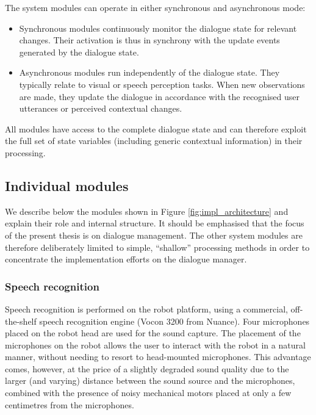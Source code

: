 The system modules can operate in either synchronous and asynchronous mode: \begin{itemize}
\item Synchronous modules continuously monitor the dialogue state for relevant changes.  Their activation is thus in synchrony with the update events generated by the dialogue state.
\item Asynchronous modules run independently of the dialogue state.  They typically relate to visual or speech perception tasks. When new observations are made, they update the dialogue in accordance with the recognised user utterances or perceived contextual changes.

\end{itemize}

All modules have access to the complete dialogue state and can therefore exploit the full set of state variables (including generic contextual information) in their processing. 

\subsection{Individual modules}

We describe below the modules shown in Figure \ref{fig:impl_architecture} and explain their role and internal structure. It should be emphasised that the focus of the present thesis is on dialogue management.  The other system modules are therefore deliberately limited to simple, ``shallow'' processing methods in order to concentrate the implementation efforts on the dialogue manager. %

\subsubsection*{Speech recognition}

Speech recognition is performed on the robot platform, using a commercial, off-the-shelf speech recognition engine (Vocon 3200 from Nuance).  Four microphones placed on the robot head are used for the sound capture.  The placement of the microphones on the robot allows the user to interact with the robot in a natural manner, without needing to resort to head-mounted microphones. This advantage comes, however, at the price of a slightly degraded sound quality due to the larger (and varying) distance between the sound source and the microphones, combined with the presence of noisy mechanical motors placed at only a few centimetres from the microphones. 

